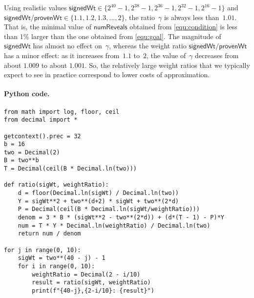 \documentclass[11pt,hidelinks]{article}
\newcommand{\numreveals}{\mathsf{numReveals}}
\newcommand{\sigwt}{\mathsf{signedWt}}
\newcommand{\provwt}{\mathsf{provenWt}}
\begin{document}
Using realistic values $\sigwt \in \{2^{40} - 1, 2^{38} - 1, 2^{36} - 1, 2^{32} - 1, 2^{16} - 1\}$ and $\sigwt/\provwt \in \{1.1, 1.2, 1.3, \ldots, 2\}$, the ratio~$\gamma$ is always less than~$1.01$.
That is, the minimal value of $\numreveals$ obtained from \cref{equ:condition} is less than 1\% larger than the one obtained from \cref{equ:goal}.
The magnitude of $\sigwt$ has almost no effect on~$\gamma$, whereas the weight ratio $\sigwt/\provwt$ has a minor effect: as it increases from~$1.1$ to~$2$, the value of~$\gamma$ decreases from about $1.009$ to about $1.001$.
So, the relatively large weight ratios that we typically expect to see in practice correspond to lower costs of approximation.

\paragraph{Python code.}

\begin{verbatim}
from math import log, floor, ceil
from decimal import *

getcontext().prec = 32
b = 16
two = Decimal(2)
B = two**b
T = Decimal(ceil(B * Decimal.ln(two)))

def ratio(sigWt, weightRatio):
    d = floor(Decimal.ln(sigWt) / Decimal.ln(two))
    Y = sigWt**2 + two**(d+2) * sigWt + two**(2*d)
    P = Decimal(ceil(B * Decimal.ln(sigWt/weightRatio)))
    denom = 3 * B * (sigWt**2 - two**(2*d)) + (d*(T - 1) - P)*Y
    num = T * Y * Decimal.ln(weightRatio) / Decimal.ln(two)
    return num / denom

for j in range(0, 10):
    sigWt = two**(40 - j) - 1
    for i in range(0, 10):
        weightRatio = Decimal(2 - i/10)
        result = ratio(sigWt, weightRatio)
        print(f"{40-j},{2-i/10}: {result}")
\end{verbatim}

 

\end{document}
